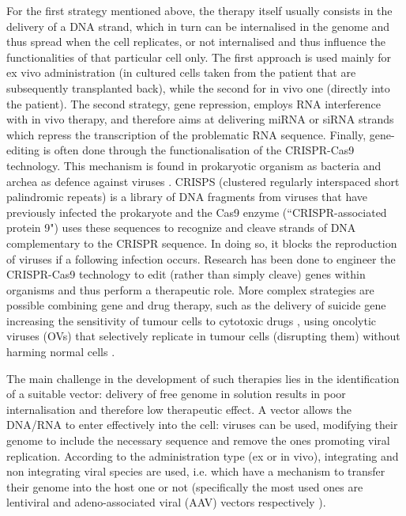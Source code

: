 For the first strategy mentioned above, the therapy itself usually consists in the delivery of a DNA strand, which in turn can be internalised in the genome and thus spread when the cell replicates, or not internalised and thus influence the functionalities of that particular cell only. The first approach is used mainly for ex vivo administration (in cultured cells taken from the patient that are subsequently transplanted back), while the second for in vivo one (directly into the patient).
%
The second strategy, gene repression, employs RNA interference with in vivo therapy, and therefore aims at delivering miRNA or siRNA strands which repress the transcription of the problematic RNA sequence.
%
Finally, gene-editing is often done through the functionalisation of the CRISPR-Cas9 technology. This mechanism is found in prokaryotic organism as bacteria and archea as defence against viruses \cite{Barrangou2015}.
CRISPS (clustered regularly interspaced short palindromic repeats) is a library of DNA fragments from viruses that have previously infected the prokaryote and the Cas9 enzyme (``CRISPR-associated protein 9") uses these sequences to recognize and cleave strands of DNA complementary to the CRISPR sequence. In doing so, it blocks the reproduction of viruses if a following infection occurs. Research has been done to engineer the CRISPR-Cas9 technology to edit (rather than simply cleave) genes within organisms \cite{Zhang2014cas,Hsu2014} and thus perform a therapeutic role.
%
More complex strategies are possible combining gene and drug therapy, such as the delivery of suicide gene increasing the sensitivity of tumour cells to cytotoxic drugs \cite{Oldfield1993},
%
using oncolytic viruses (OVs) that selectively replicate in tumour cells (disrupting them) without harming normal cells \cite{Lawler2017}.

The main challenge in the development of such therapies lies in the identification of a suitable vector: delivery of free genome in solution results in poor internalisation and therefore low therapeutic effect. A vector allows the DNA/RNA to enter effectively into the cell: viruses can be used, modifying their genome to include the necessary sequence and remove the ones promoting viral replication.
%
According to the administration type (ex or in vivo), integrating and non integrating viral species are used, i.e. which have a mechanism to transfer their genome into the host one or not (specifically the most used ones are lentiviral and adeno-associated viral (AAV) vectors respectively \cite{Naldini2011,Mingozzi2011}).


